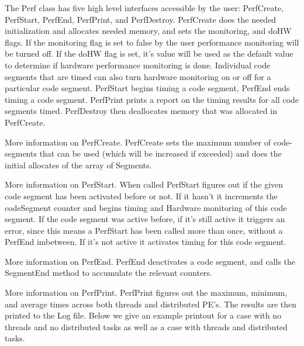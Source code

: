 %


The Perf class has five high level interfaces accessible by the user:
PerfCreate, PerfStart, PerfEnd, PerfPrint, and PerfDestroy. PerfCreate does the needed
initialization and allocates needed memory, and sets the monitoring, and doHW 
flags. If the monitoring flag is set to false by the user performance monitoring 
will be turned off. If the doHW flag is set, it's value will be used as the 
default value to determine if hardware performance monitoring is done. Individual code
segments that are timed can also turn hardware monitoring on or off for
a particular code segment. PerfStart begins timing a code segment, PerfEnd
ends timing a code segment. PerfPrint prints a report on the timing results
for all code segments timed. PerfDestroy then deallocates memory that was
allocated in PerfCreate.

More information on PerfCreate. PerfCreate sets the maximum number of code-segments
that can be used (which will be increased if exceeded) and does the initial
allocates of the array of Segments.

More information on PerfStart. When called PerfStart figures out if the given
code segment has been activated before or not. If it hasn't it increments
the codeSegment counter and begins timing and Hardware monitoring of this
code segment. If the code segment was active before, if it's still active
it triggers an error, since this means a PerfStart has been called more than
once, without a PerfEnd imbetween. If it's not active it activates timing
for this code segment.

More information on PerfEnd. PerfEnd deactivates a code segment, and calls
the SegmentEnd method to accumulate the relevant counters.

More information on PerfPrint. PerfPrint figures out the maximum, minimum, and
average times across both threads and distributed PE's. The results are then 
printed to the Log file. Below we give an example printout for a case with
no threads and no distributed tasks as well as a case with threads and distributed
tasks.


